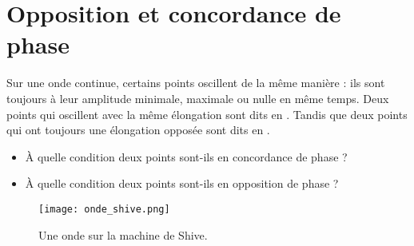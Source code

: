 \newpage

\section{Opposition et concordance de phase}
Sur une onde continue, certains points oscillent de la même manière : ils sont toujours à leur amplitude minimale, maximale ou nulle en même temps. Deux points qui oscillent avec la même élongation sont dits en . Tandis que deux points qui ont toujours une élongation opposée sont dits en .
\begin{itemize}[label=\textbullet]
    \item À quelle condition deux points sont-ils en concordance de phase ?
    \item À quelle condition deux points sont-ils en opposition de phase ?
\end{itemize}

\begin{figure}[ht!]
    \centering
    \texttt{[image: onde\_shive.png]}
    \caption{Une onde sur la machine de Shive.}
    \label{onde_shive}
\end{figure}
